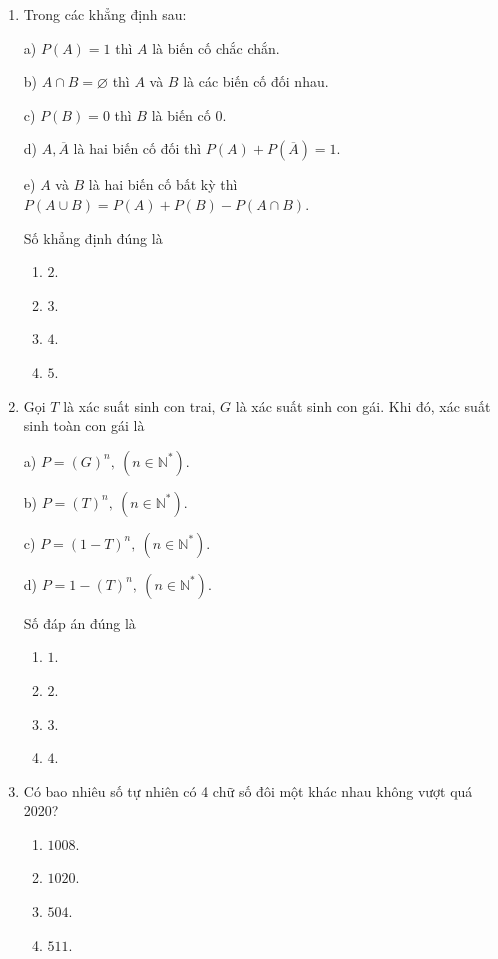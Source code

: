 \begin{enumerate}[label=\textbf{Câu \arabic*.},align=left,left=0cm..0cm,itemindent=*]
	\item Trong các khẳng định sau:\par
	a) $P(A)=1$ thì $A$ là biến cố chắc chắn.\par
	b) $A\cap B=\varnothing$ thì $A$ và $B$ là các biến cố đối nhau.\par
	c) $P(B)=0$ thì $B$ là biến cố 0.\par
	d) $A,\overline{A}$ là hai biến cố đối thì $P(A)+P\left(\overline{A}\right)=1$.\par
	e) $A$ và $B$ là hai biến cố bất kỳ thì $P (A\cup B)=P(A)+P(B)-P (A\cap B)$.\par
	Số khẳng định đúng là
	\begin{multicols}{4}\begin{enumerate}[label=\textbf{\Alph*.},align=left,left=1cm..0cm,itemindent=*]
		\item $2$. \item $3$. \item $4$. \item $5$.
	\end{enumerate}\end{multicols}
	\item Gọi $T$ là xác suất sinh con trai, $G$ là xác suất sinh con gái. Khi đó, xác suất sinh toàn con gái là\par
	a) $P=(G)^n,~(n\in\mathbb{N}^*)$.\par
	b) $P=(T)^n,~(n\in\mathbb{N}^*)$.\par
	c) $P=(1-T)^n,~(n\in\mathbb{N}^*)$.\par
	d) $P=1-(T)^n,~(n\in\mathbb{N}^*)$.\par
	Số đáp án đúng là
	\begin{multicols}{4}\begin{enumerate}[label=\textbf{\Alph*.},align=left,left=1cm..0cm,itemindent=*]
		\item $1$. \item $2$. \item $3$. \item $4$.
	\end{enumerate}\end{multicols}
	\item Có bao nhiêu số tự nhiên có 4 chữ số đôi một khác nhau không vượt quá 2020?
	\begin{multicols}{4}\begin{enumerate}[label=\textbf{\Alph*.},align=left,left=1cm..0cm,itemindent=*]
		\item $1008$. \item $1020$. \item $504$. \item $511$.

\end{enumerate}
\end{multicols}
\end{enumerate}
